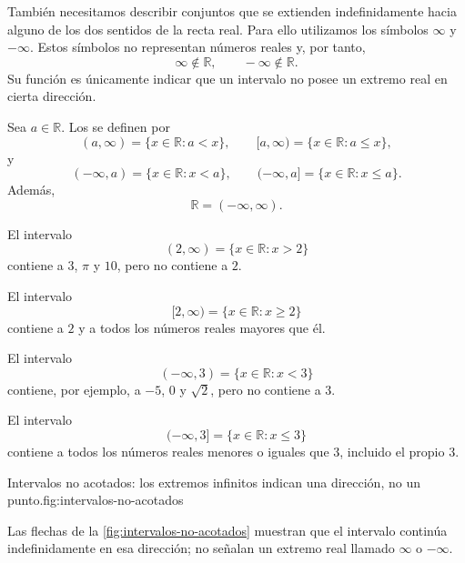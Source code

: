 También necesitamos describir conjuntos que se extienden indefinidamente hacia alguno de los dos sentidos de la recta real. Para ello utilizamos los símbolos $\infty$ y $-\infty$. Estos símbolos no representan números reales y, por tanto,
\[
\infty\notin\mathbb{R},\qquad -\infty\notin\mathbb{R}.
\]
Su función es únicamente indicar que un intervalo no posee un extremo real en cierta dirección.

\begin{samepage}
\begin{definition}
\label{def:intervalos-no-acotados}
Sea $a\in\mathbb{R}$. Los  se definen por
\[
(a,\infty)=\{x\in\mathbb{R}:a<x\},\qquad [a,\infty)=\{x\in\mathbb{R}:a\leq x\},
\]
y
\[
(-\infty,a)=\{x\in\mathbb{R}:x<a\},\qquad (-\infty,a]=\{x\in\mathbb{R}:x\leq a\}.
\]
Además,
\[
\mathbb{R}=(-\infty,\infty).
\]
\end{definition}
\end{samepage}

\begin{example}
El intervalo
\[
(2,\infty)=\{x\in\mathbb{R}:x>2\}
\]
contiene a $3$, $\pi$ y $10$, pero no contiene a $2$.
\end{example}

\begin{example}
El intervalo
\[
[2,\infty)=\{x\in\mathbb{R}:x\geq2\}
\]
contiene a $2$ y a todos los números reales mayores que él.
\end{example}

\begin{example}
El intervalo
\[
(-\infty,3)=\{x\in\mathbb{R}:x<3\}
\]
contiene, por ejemplo, a $-5$, $0$ y $\sqrt2$, pero no contiene a $3$.
\end{example}

\begin{example}
El intervalo
\[
(-\infty,3]=\{x\in\mathbb{R}:x\leq3\}
\]
contiene a todos los números reales menores o iguales que $3$, incluido el propio $3$.
\end{example}

\begin{figuranotas}{Intervalos no acotados: los extremos infinitos indican una dirección, no un punto.}{fig:intervalos-no-acotados}

\end{figuranotas}
Las flechas de la \cref{fig:intervalos-no-acotados} muestran que el intervalo continúa indefinidamente en esa dirección; no señalan un extremo real llamado $\infty$ o $-\infty$.

